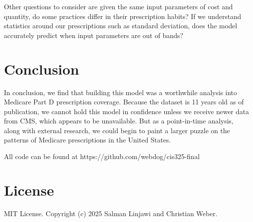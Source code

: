 \documentclass{article}
\begin{document}
Other questions to consider are given the same input parameters of cost and quantity, do some practices differ in their prescription habits? If we understand statistics around our prescriptions such as standard deviation, does the model accurately predict when input parameters are out of bands?

\section{Conclusion}

In conclusion, we find that building this model was a worthwhile analysis into Medicare Part D prescription coverage. Because the dataset is 11 years old as of publication, we cannot hold this model in confidence unless we receive newer data from CMS, which appears to be unavailable. But as a point-in-time analysis, along with external research, we could begin to paint a larger puzzle on the patterns of Medicare prescriptions in the United States.

All code can be found at https://github.com/webdog/cis325-final

\section{License}
MIT License. Copyright (c) 2025 Salman Linjawi and Christian Weber.
\end{document}
